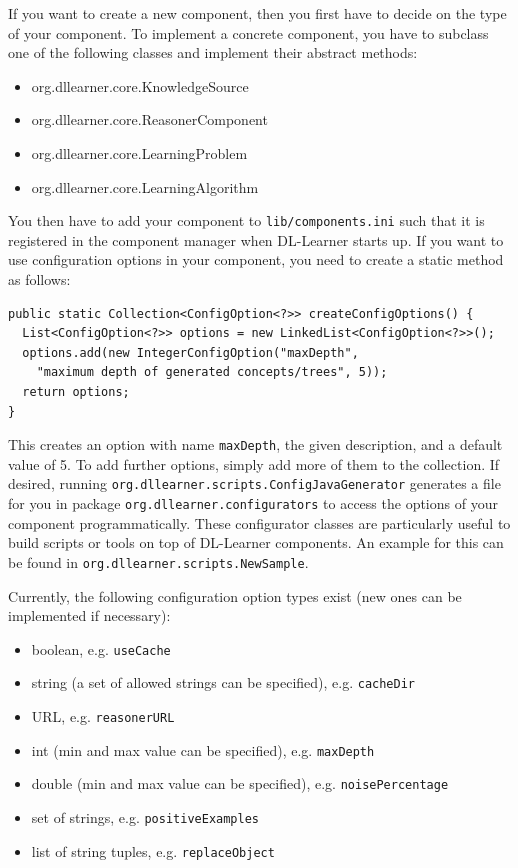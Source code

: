 \documentclass[a4paper,12pt]{scrartcl}
\begin{document}
If you want to create a new component, then you first have to decide on the type of your component. To implement a concrete component, you have to subclass one of the following classes and implement their abstract methods:

\begin{itemize}
 \item org.dllearner.core.KnowledgeSource
 \item org.dllearner.core.ReasonerComponent
 \item org.dllearner.core.LearningProblem
 \item org.dllearner.core.LearningAlgorithm
\end{itemize}

You then have to add your component to \verb|lib/components.ini| such that it is registered in the component manager when DL-Learner starts up. If you want to use configuration options in your component, you need to create a static method as follows:

\begin{verbatim}
public static Collection<ConfigOption<?>> createConfigOptions() {
  List<ConfigOption<?>> options = new LinkedList<ConfigOption<?>>();
  options.add(new IntegerConfigOption("maxDepth", 
    "maximum depth of generated concepts/trees", 5));
  return options;
}
\end{verbatim}

This creates an option with name \verb|maxDepth|, the given description, and a default value of 5. To add further options, simply add more of them to the collection. If desired, running \verb|org.dllearner.scripts.ConfigJavaGenerator| generates a file for you in package \verb|org.dllearner.configurators| to access the options of your component programmatically. These configurator classes are particularly useful to build scripts or tools on top of DL-Learner components. An example for this can be found in \verb|org.dllearner.scripts.NewSample|.

Currently, the following configuration option types exist (new ones can be implemented if necessary):

\begin{itemize}
 \item boolean, e.g. \verb|useCache|
 \item string (a set of allowed strings can be specified), e.g. \verb|cacheDir|
 \item URL, e.g. \verb|reasonerURL|
 \item int (min and max value can be specified), e.g. \verb|maxDepth|
 \item double (min and max value can be specified), e.g. \verb|noisePercentage|
 \item set of strings, e.g. \verb|positiveExamples|
 \item list of string tuples, e.g. \verb|replaceObject|
\end{itemize}
\end{document}
